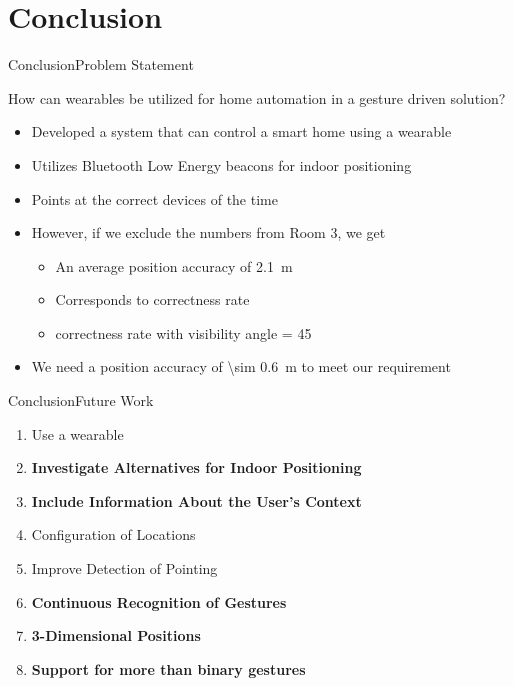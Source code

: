 \section{Conclusion}
\begin{frame}{Conclusion}{Problem Statement}
  \begin{framed}
    How can wearables be utilized for home automation in a gesture driven solution?
  \end{framed}
  
  \begin{itemize}
    \item<2-> Developed a system that can control a smart home using a wearable
    \item<2-> Utilizes Bluetooth Low Energy beacons for indoor positioning
    \item<2-> Points at the correct devices  of the time
    \item<2-> However, if we exclude the numbers from Room 3, we get
    \begin{itemize}
      \item<2-> An average position accuracy of \SI{2.1}{\meter}
      \item<2-> Corresponds to  correctness rate
      \item<2->  correctness rate with visibility angle = 45\degree
    \end{itemize}
    \item<2-> We need a position accuracy of \SI{\sim 0.6}{\meter} to meet our requirement
  \end{itemize}
\end{frame}

\begin{frame}{Conclusion}{Future Work}
  \begin{enumerate}
    \item Use a wearable
    \item \textbf<2>{Investigate Alternatives for Indoor Positioning }
    \item \textbf<3>{Include Information About the User's Context}
    \item Configuration of Locations
    \item Improve Detection of Pointing
    \item \textbf<4>{Continuous Recognition of Gestures}
    \item \textbf<5>{3-Dimensional Positions}
    \item \textbf<6>{Support for more than binary gestures}
  \end{enumerate}
\end{frame}
